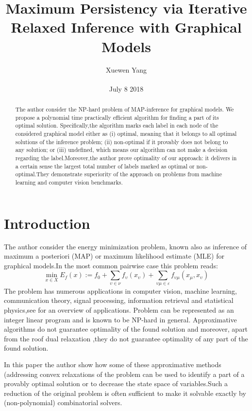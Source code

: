 \documentclass[10pt,twocolumn,letterpaper]{article}
\author{Xuewen Yang\\\\
July 8 2018}
\title{Maximum Persistency via Iterative Relaxed Inference with Graphical Models}
\begin{document}
\maketitle
\begin{abstract}
The author consider the NP-hard problem of MAP-inference for graphical models. We propose a polynomial time practically efficient algorithm for finding a part of its optimal solution. Specifically,the algorithm marks each label in each node of the considered graphical model either as (i)
optimal, meaning that it belongs to all optimal solutions of the inference problem; (ii) non-optimal if it provably does not belong to any solution; or (iii) undefined, which means our algorithm can not make a decision regarding the label.Moreover,the author prove optimality of our approach: it delivers in a certain sense the largest total number of labels marked as optimal or non-optimal.They demonstrate superiority of
the approach on problems from machine learning and computer vision benchmarks.
\end{abstract}
\section{Introduction}
The author consider the energy minimization problem, known also as inference of maximum a posteriori (MAP) or maximum likelihood estimate (MLE) for graphical models.In the most common pairwise case this problem reads:
$$
\min_{x\in X} E_{f}(x):=f_0+\sum_{\upsilon \in \nu}f_{\upsilon}(x_\upsilon)+\sum_{\upsilon \mu \in \varepsilon}f_{\upsilon\mu}(x_\mu,x_\upsilon)
$$
The problem has numerous applications in computer vision, machine learning, communication theory, signal processing, information retrieval and statistical physics,see\cite{Andres2015A}\cite{Wainwright2008Graphical} for an overview of applications. Problem can be represented as an integer linear program and is known to be NP-hard in general. Approximative algorithms do not guarantee optimality of the found solution and moreover, apart from the roof dual relaxation ,they do not guarantee optimality of any part of the found solution.

In this paper the author show how some of these approximative methods (addressing convex relaxations of the problem can be used to identify a part of a provably optimal solution or to decrease the state space of variables.Such a reduction of the original problem is often sufficient to make it solvable exactly by (non-polynomial) combinatorial solvers.
\end{document}
